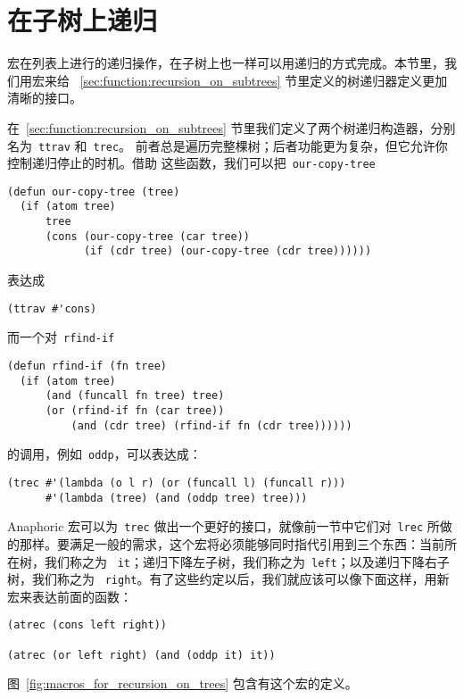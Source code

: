 \section{在子树上递归}
\label{sec:macro:recursion_on_subtrees}

宏在列表上进行的递归操作，在子树上也一样可以用递归的方式完成。本节里，我们用宏来给
~\ref{sec:function:recursion_on_subtrees} 节里定义的树递归器定义更加清晰的接口。

在~\ref{sec:function:recursion_on_subtrees} 节里我们定义了两个树递归构造器，分别名为~\texttt{ttrav} 和~\texttt{trec}。
前者总是遍历完整棵树；后者功能更为复杂，但它允许你控制递归停止的时机。借助
这些函数，我们可以把~\texttt{our-copy-tree}
\begin{lstlisting}
(defun our-copy-tree (tree)
  (if (atom tree)
      tree
      (cons (our-copy-tree (car tree))
            (if (cdr tree) (our-copy-tree (cdr tree))))))
\end{lstlisting}
表达成
\begin{lstlisting}
(ttrav #'cons)
\end{lstlisting}
而一个对~\texttt{rfind-if}
\begin{lstlisting}
(defun rfind-if (fn tree)
  (if (atom tree)
      (and (funcall fn tree) tree)
      (or (rfind-if fn (car tree))
          (and (cdr tree) (rfind-if fn (cdr tree))))))
\end{lstlisting}
的调用，例如~\texttt{oddp}，可以表达成：
\begin{lstlisting}
(trec #'(lambda (o l r) (or (funcall l) (funcall r)))
      #'(lambda (tree) (and (oddp tree) tree)))
\end{lstlisting}

Anaphoric 宏可以为~\texttt{trec} 做出一个更好的接口，就像前一节中它们对~\texttt{lrec}
所做的那样。要满足一般的需求，这个宏将必须能够同时指代引用到三个东西：当前所在树，我们称之为
~\texttt{it}；递归下降左子树，我们称之为~\texttt{left}；以及递归下降右子树，我们称之为
~\texttt{right}。有了这些约定以后，我们就应该可以像下面这样，用新宏来表达前面的函数：
\begin{lstlisting}
(atrec (cons left right))

(atrec (or left right) (and (oddp it) it))
\end{lstlisting}
图~\ref{fig:macros_for_recursion_on_trees} 包含有这个宏的定义。

